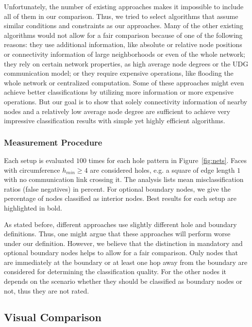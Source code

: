 \documentclass{llncs}
\begin{document}
Unfortunately, the number of existing approaches makes it impossible to include all of them in our comparison.
Thus, we tried to select algorithms that assume similar conditions and constraints as our approaches.
Many of the other existing algorithms would not allow for a fair comparison because of one of the following reasons:
they use additional information, like absolute or relative node positions or connectivity information of large neighborhoods or even of the whole network;
they rely on certain network properties, as high average node degrees or the UDG communication model;
or they require expensive operations, like flooding the whole network or centralized computation.
Some of these approaches might even achieve better classifications by utilizing more information or more expensive operations.
But our goal is to show that solely connectivity information of nearby nodes and a relatively low average node degree are sufficient to achieve very impressive classification results with simple yet highly efficient algorithms.


\subsubsection{Measurement Procedure}
Each setup is evaluated $100$ times for each hole pattern in Figure~\ref{fig:nets}.
Faces with circumference $h_{min} \geq 4$ are considered holes, e.g. a square of edge length $1$ with no communication link crossing it.
The analysis lists mean misclassification ratios (false negatives) in percent.
For optional boundary nodes, we give the percentage of nodes classified as interior nodes.
Best results for each setup are highlighted in bold.

As stated before, different approaches use slightly different hole and boundary definitions.
Thus, one might argue that these approaches will perform worse under our definition.
However, we believe that the distinction in mandatory and optional boundary nodes helps to allow for a fair comparison.
Only nodes that are immediately at the boundary or at least one hop away from the boundary are considered for determining the classification quality.
For the other nodes it depends on the scenario whether they should be classified as boundary nodes or not, thus they are not rated.


\subsection{Visual Comparison}\label{ssec:visual_comparison}
\end{document}
